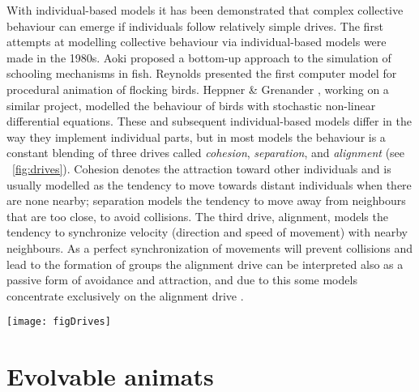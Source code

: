 With individual-based models it has been demonstrated that complex collective behaviour can emerge if individuals follow relatively simple drives. The first attempts at modelling collective behaviour via individual-based models were made in the 1980s. Aoki \cite{aoki1982simulation} proposed a bottom-up approach to the simulation of schooling mechanisms in fish. Reynolds \cite{reynolds1987flocks} presented the first computer model for procedural animation of flocking birds. Heppner \& Grenander \cite{heppner1990stochastic}, working on a similar project, modelled the behaviour of birds with stochastic non-linear differential equations. These and subsequent individual-based models \cite{couzin2002collective,demsar2013family,demsar2014simulated,demsar2015simulating,demsar2016balanced,demsar2017evolution,helbing1995social,hildenbrandt2010selforganized,lebarbajec2009organized,parrish2002schools,schellinck2011review,sumpter2006principles,vicsek2012collective} differ in the way they implement individual parts, but in most models the behaviour is a constant blending of three drives called \emph{cohesion}, \emph{separation}, and \emph{alignment} (see \figurename~\ref{fig:drives}). Cohesion denotes the attraction toward other individuals and is usually modelled as the tendency to move towards distant individuals when there are none nearby; separation models the tendency to move away from neighbours that are too close, to avoid collisions. The third drive, alignment, models the tendency to synchronize velocity (direction and speed of movement) with nearby neighbours. As a perfect synchronization of movements will prevent collisions and lead to the formation of groups the alignment drive can be interpreted also as a passive form of avoidance and attraction, and due to this some models concentrate exclusively on the alignment drive \cite{vicsek1995novel}.

\begin{figure*}
  \texttt{[image: figDrives]}
  \caption{Visualization of the three basic drives: (a) cohesion, (b) separation, and (c) alignment. The black animat is the observed individual. The grey animats are the perceived neighbours that influence the observed animat's behaviour. The white and outlined animats are neighbours that have no direct influence on the observed animat's behaviour.}
  \label{fig:drives}
\end{figure*}

\section{Evolvable animats}

